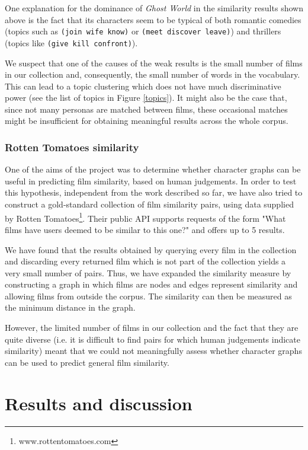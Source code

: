 \documentclass[bsc,frontabs,singlespacing,parskip, twoside]{infthesis}
\begin{document}
One explanation for the dominance of \textit{Ghost World} in the similarity results shown above is the fact that its characters seem to be typical of both romantic comedies (topics such as \texttt{(join wife know)} or \texttt{(meet discover leave)}) and thrillers (topics like \texttt{(give kill confront)}).

We suspect that one of the causes of the weak results is the small number of films in our collection and, consequently, the small number of words in the vocabulary. This can lead to a topic clustering which does not have much discriminative power (see the list of topics in Figure \ref{topics}). It might also be the case that, since not many personas are matched between films, these occasional matches might be insufficient for obtaining meaningful results across the whole corpus.

\subsection{Rotten Tomatoes similarity}
One of the aims of the project was to determine whether character graphs can be useful in predicting film similarity, based on human judgements. In order to test this hypothesis, independent from the work described so far, we have also tried to construct a gold-standard collection of film similarity pairs, using data supplied by Rotten Tomatoes\footnote{www.rottentomatoes.com}. Their public API supports requests of the form "What films have users deemed to be similar to this one?" and offers up to 5 results.

We have found that the results obtained by querying every film in the collection and discarding every returned film which is not part of the collection yields a very small number of pairs. Thus, we have expanded the similarity measure by constructing a graph in which films are nodes and edges represent similarity and allowing films from outside the corpus. The similarity can then be measured as the minimum distance in the graph.

However, the limited number of films in our collection and the fact that they are quite diverse (i.e. it is difficult to find pairs for which human judgements indicate similarity) meant that we could not meaningfully assess whether character graphs can be used to predict general film similarity. 

\chapter{Results and discussion}
\label{chap:results}
\end{document}
